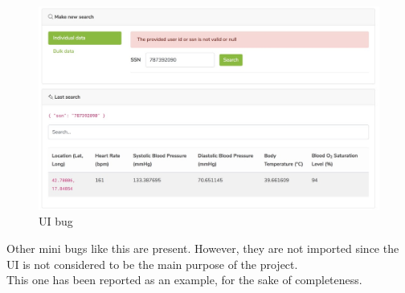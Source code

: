 \begin{itemize}
\begin{figure}[H]
\includegraphics[width=\linewidth]{images/bug1.png}
\caption{ UI bug }
\label{fig:bug1}
\end{figure}

Other mini bugs like this are present. However, they are not imported since the 
UI is not considered to be the main purpose of the project. \\
This one has been reported as an example, for the sake of completeness.
\end{itemize}